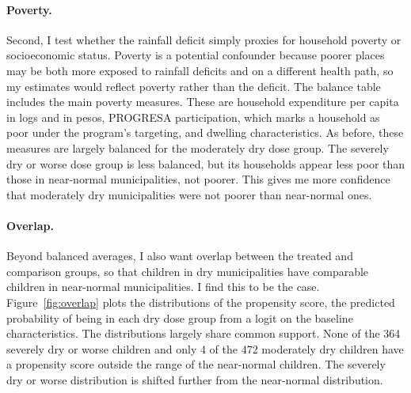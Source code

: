 \documentclass[12pt]{article}
\begin{document}
\paragraph{Poverty.} Second, I test whether the rainfall deficit simply proxies for household poverty or socioeconomic status. Poverty is a potential confounder because poorer places may be both more exposed to rainfall deficits and on a different health path, so my estimates would reflect poverty rather than the deficit. The balance table includes the main poverty measures. These are household expenditure per capita in logs and in pesos, PROGRESA participation, which marks a household as poor under the program's targeting, and dwelling characteristics. As before, these measures are largely balanced for the moderately dry dose group. The severely dry or worse dose group is less balanced, but its households appear less poor than those in near-normal municipalities, not poorer. This gives me more confidence that moderately dry municipalities were not poorer than near-normal ones.

\paragraph{Overlap.} Beyond balanced averages, I also want overlap between the treated and comparison groups, so that children in dry municipalities have comparable children in near-normal municipalities. I find this to be the case. Figure~\ref{fig:overlap} plots the distributions of the propensity score, the predicted probability of being in each dry dose group from a logit on the baseline characteristics. The distributions largely share common support. None of the 364 severely dry or worse children and only 4 of the 472 moderately dry children have a propensity score outside the range of the near-normal children. The severely dry or worse distribution is shifted further from the near-normal distribution.
\end{document}

